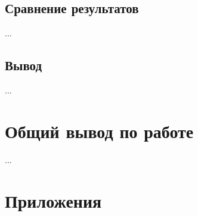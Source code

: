 \documentclass[a4paper, 12pt]{article}
\begin{document}
    
    \subsection{Сравнение результатов}
    ...


    \subsection{Вывод}
    ...


    \section{Общий вывод по работе}
    ...


    \section{Приложения}
\end{document}

